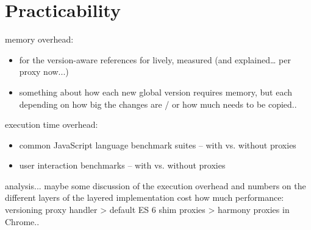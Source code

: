\section{Practicability}

memory overhead:
\begin{itemize}
    \item for the version-aware references for lively, measured (and explained… per proxy now...)
    \item something about how each new global version requires memory, but each depending on how big the changes are / or how much needs to be copied..
\end{itemize}


execution time overhead:
\begin{itemize}
    \item common JavaScript language benchmark suites – with vs. without proxies
    \item user interaction benchmarks – with vs. without proxies
\end{itemize}


analysis...
maybe some discussion of the execution overhead and numbers on the different layers of the layered implementation cost how much performance: versioning proxy handler > default ES 6 shim proxies > harmony proxies in Chrome..